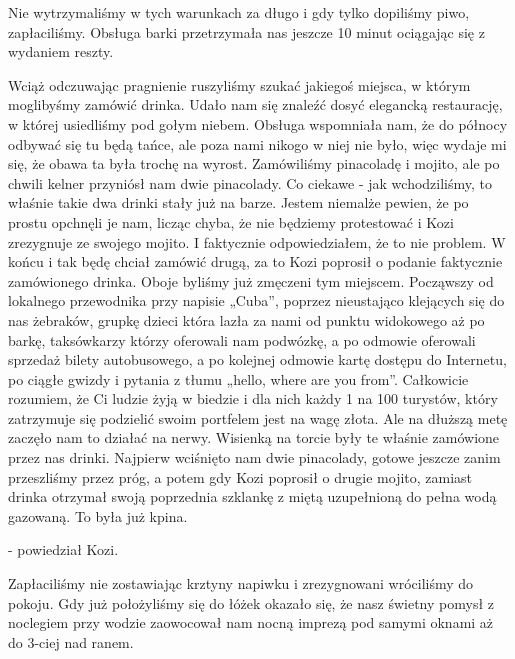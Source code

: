 Nie wytrzymaliśmy w tych warunkach za długo i gdy tylko dopiliśmy piwo, zapłaciliśmy.
Obsługa barki przetrzymała nas jeszcze 10 minut ociągając się z wydaniem reszty.
\par Wciąż odczuwając pragnienie ruszyliśmy szukać jakiegoś miejsca, w którym moglibyśmy zamówić drinka.
Udało nam się znaleźć dosyć elegancką restaurację, w której usiedliśmy pod gołym niebem.
Obsługa wspomniała nam, że do północy odbywać się tu będą tańce, ale poza nami nikogo w niej nie było, więc wydaje mi się, że obawa ta była trochę na wyrost.
Zamówiliśmy pinacoladę i mojito, ale po chwili kelner przyniósł nam dwie pinacolady.
Co ciekawe - jak wchodziliśmy, to właśnie takie dwa drinki stały już na barze.
Jestem niemalże pewien, że po prostu opchnęli je nam, licząc chyba, że nie będziemy protestować i Kozi zrezygnuje ze swojego mojito.
I faktycznie odpowiedziałem, że to nie problem. W końcu i tak będę chciał zamówić drugą, za to Kozi poprosił o podanie faktycznie zamówionego drinka.
Oboje byliśmy już zmęczeni tym miejscem.
Począwszy od lokalnego przewodnika przy napisie „Cuba”, poprzez nieustająco klejących się do nas żebraków, grupkę dzieci która lazła za nami od punktu widokowego aż po barkę, taksówkarzy którzy oferowali nam podwózkę, a po odmowie oferowali sprzedaż bilety autobusowego, a po kolejnej odmowie kartę dostępu do Internetu, po ciągłe gwizdy i pytania z tłumu „hello, where are you from”.
Całkowicie rozumiem, że Ci ludzie żyją w biedzie i dla nich każdy 1 na 100 turystów, który zatrzymuje się podzielić swoim portfelem jest na wagę złota.
Ale na dłuższą metę zaczęło nam to działać na nerwy.
Wisienką na torcie były te właśnie zamówione przez nas drinki.
Najpierw wciśnięto nam dwie pinacolady, gotowe jeszcze zanim przeszliśmy przez próg, a potem gdy Kozi poprosił o drugie mojito, zamiast drinka otrzymał swoją poprzednia szklankę z miętą uzupełnioną do pełna wodą gazowaną. To była już kpina.

\noindent - powiedział Kozi.
 
Zapłaciliśmy nie zostawiając krztyny napiwku i zrezygnowani wróciliśmy do pokoju.
Gdy już położyliśmy się do łóżek okazało się, że nasz świetny pomysł z noclegiem przy wodzie zaowocował nam nocną imprezą pod samymi oknami aż do 3-ciej nad ranem.